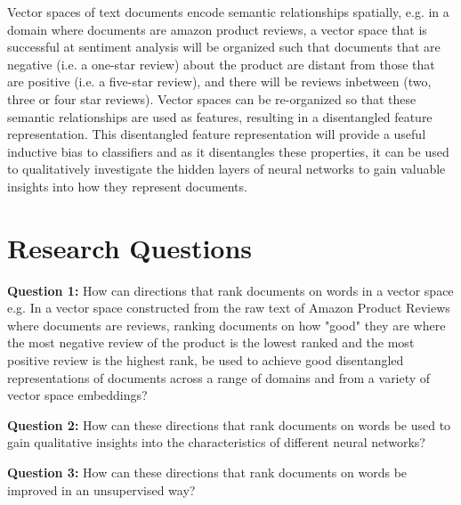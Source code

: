 Vector spaces of text documents encode semantic relationships spatially, e.g. in a domain where documents are amazon product reviews, a vector space that is successful at sentiment analysis will be organized such that documents that are negative (i.e. a one-star review) about the product are distant from those that are positive (i.e. a five-star review), and there will be reviews inbetween (two, three or four star reviews). Vector spaces can be re-organized so that these semantic relationships are used as features, resulting in a disentangled feature representation. This disentangled feature representation will provide a useful inductive bias to classifiers and as it disentangles these properties, it can be used to qualitatively investigate the hidden layers of neural networks to gain valuable insights into how they represent documents. 


\section{Research Questions}

\textbf{Question 1:} How can directions that rank documents on words in a vector space e.g. In a vector space constructed from the raw text of Amazon Product Reviews where documents are reviews, ranking documents on how "good" they are where the most negative review of the product is the lowest ranked and the most positive review is the highest rank, be used to achieve good disentangled representations of documents across a range of domains and from a variety of vector space embeddings?

\textbf{Question 2:} How can these directions that rank documents on words be used to gain qualitative insights into the characteristics of different neural networks?

\textbf{Question 3:} How can these directions that rank documents on words be improved in an unsupervised way?

